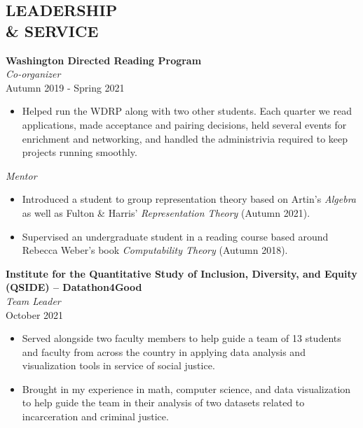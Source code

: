 \documentclass[margin]{res} %
\begin{document}
\begin{resume}
\section{LEADERSHIP\\ \& SERVICE}

{\bf Washington Directed Reading Program}\\
{\sl Co-organizer}\\
Autumn 2019 - Spring 2021
\begin{itemize}\itemsep -1pt
	\item Helped run the WDRP along with two other students. Each quarter we read applications, made acceptance and pairing decisions, held several events for enrichment and networking, and handled the administrivia required to keep projects running smoothly.
\end{itemize}
{\sl Mentor}
\begin{itemize}\itemsep -1pt
    \item Introduced a student to group representation theory based on Artin's \textit{Algebra} as well as Fulton \& Harris' \textit{Representation Theory} (Autumn 2021).
	\item Supervised an undergraduate student in a reading course based around Rebecca Weber's book {\sl Computability Theory} (Autumn 2018).
\end{itemize}

\textbf{Institute for the Quantitative Study of Inclusion, Diversity, and Equity (QSIDE) -- Datathon4Good}\\
\textit{Team Leader}\\
October 2021
\begin{itemize}
    \item Served alongside two faculty members to help guide a team of 13 students and faculty from across the country in applying data analysis and visualization tools in service of social justice.
    \item Brought in my experience in math, computer science, and data visualization to help guide the team in their analysis of two datasets related to incarceration and criminal justice.
\end{itemize}

\pagebreak

\end{resume}
\end{document}

